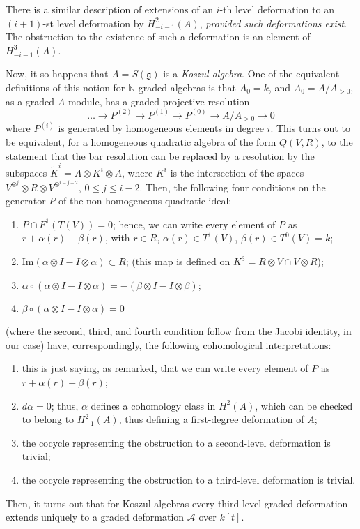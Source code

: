 \begin{remark}
There is a similar description of extensions of an $i$-th level deformation to an $(i+1)$-st level deformation by $H^2_{-i-1}(A)$, \emph{provided such deformations exist}. The obstruction to the existence of such a deformation is an element of $H^3_{-i-1}(A)$.

Now, it so happens that $A=S(\mathfrak g)$ is a \emph{Koszul algebra}. One of the equivalent definitions of this notion for $\mathbb N$-graded algebras is that $A_0=k$, and $A_0=A/A_{>0}$, as a graded $A$-module, has a graded projective resolution 
$$ \dots \to P^{(2)} \to P^{(1)} \to P^{(0)} \to A/A_{>0} \to 0$$
where $P^{(i)}$ is generated by homogeneous elements in degree $i$. This turns out to be equivalent, for a homogeneous quadratic algebra of the form $Q(V,R)$, to the statement that the bar resolution can be replaced by a resolution by the subspaces $\tilde K^i = A\otimes K^i \otimes A$, where $K^i$ is the intersection of the spaces $V^{\otimes^j} \otimes R \otimes V^{\otimes^{i-j-2}}$, $0\le j\le i-2$. Then, the following four conditions on the generator $P$ of the non-homogeneous quadratic ideal:
\begin{enumerate}
 \item $P\cap F^1(T(V))= 0$; hence, we can write every element of $P$ as $r+\alpha(r)+\beta(r)$, with $r\in R$, $\alpha(r)\in T^1(V)$, $\beta(r)\in T^0(V)=k$;
 \item $\text{Im}(\alpha\otimes I - I\otimes \alpha) \subset R$; (this map is defined on $K^3=R\otimes V \cap V\otimes R$);
 \item $\alpha\circ(\alpha\otimes I-I\otimes \alpha) = -(\beta\otimes I-I\otimes \beta)$;
 \item $\beta\circ (\alpha\otimes I-I\otimes \alpha) = 0$
\end{enumerate}
(where the second, third, and fourth condition follow from the Jacobi identity, in our case) have, correspondingly, the following cohomological interpretations:
\begin{enumerate}
 \item this is just saying, as remarked, that we can write every element of $P$ as $r+\alpha(r)+\beta(r)$;
 \item $d\alpha =0$; thus, $\alpha$ defines a cohomology class in $H^2(A)$, which can be checked to belong to $H^2_{-1}(A)$, thus defining a first-degree deformation of $A$;
 \item the cocycle representing the obstruction to a second-level deformation is trivial;
 \item the cocycle representing the obstruction to a third-level deformation is trivial.
\end{enumerate}
Then, it turns out that for Koszul algebras every third-level graded deformation extends uniquely to a graded deformation $\mathcal A$ over $k[t]$.  
\end{remark}




